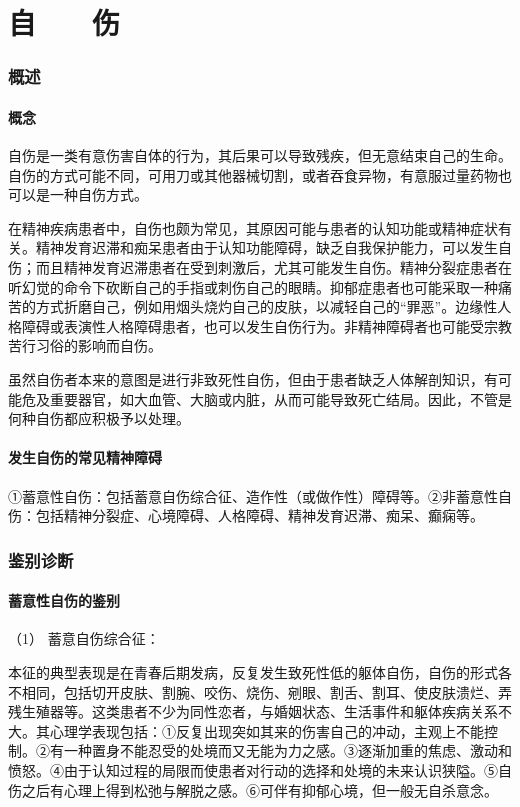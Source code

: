 \section{自　　伤}

\subsubsection{概述}

\paragraph{概念}

自伤是一类有意伤害自体的行为，其后果可以导致残疾，但无意结束自己的生命。自伤的方式可能不同，可用刀或其他器械切割，或者吞食异物，有意服过量药物也可以是一种自伤方式。

在精神疾病患者中，自伤也颇为常见，其原因可能与患者的认知功能或精神症状有关。精神发育迟滞和痴呆患者由于认知功能障碍，缺乏自我保护能力，可以发生自伤；而且精神发育迟滞患者在受到刺激后，尤其可能发生自伤。精神分裂症患者在听幻觉的命令下砍断自己的手指或刺伤自己的眼睛。抑郁症患者也可能采取一种痛苦的方式折磨自己，例如用烟头烧灼自己的皮肤，以减轻自己的“罪恶”。边缘性人格障碍或表演性人格障碍患者，也可以发生自伤行为。非精神障碍者也可能受宗教苦行习俗的影响而自伤。

虽然自伤者本来的意图是进行非致死性自伤，但由于患者缺乏人体解剖知识，有可能危及重要器官，如大血管、大脑或内脏，从而可能导致死亡结局。因此，不管是何种自伤都应积极予以处理。

\paragraph{发生自伤的常见精神障碍}

①蓄意性自伤：包括蓄意自伤综合征、造作性（或做作性）障碍等。②非蓄意性自伤：包括精神分裂症、心境障碍、人格障碍、精神发育迟滞、痴呆、癫痫等。

\subsubsection{鉴别诊断}

\paragraph{蓄意性自伤的鉴别}

\hypertarget{text00053.htmlux5cux23CHP1-18-11-2-1-1}{}
（1） 蓄意自伤综合征：

本征的典型表现是在青春后期发病，反复发生致死性低的躯体自伤，自伤的形式各不相同，包括切开皮肤、割腕、咬伤、烧伤、剜眼、割舌、割耳、使皮肤溃烂、弄残生殖器等。这类患者不少为同性恋者，与婚姻状态、生活事件和躯体疾病关系不大。其心理学表现包括：①反复出现突如其来的伤害自己的冲动，主观上不能控制。②有一种置身不能忍受的处境而又无能为力之感。③逐渐加重的焦虑、激动和愤怒。④由于认知过程的局限而使患者对行动的选择和处境的未来认识狭隘。⑤自伤之后有心理上得到松弛与解脱之感。⑥可伴有抑郁心境，但一般无自杀意念。

